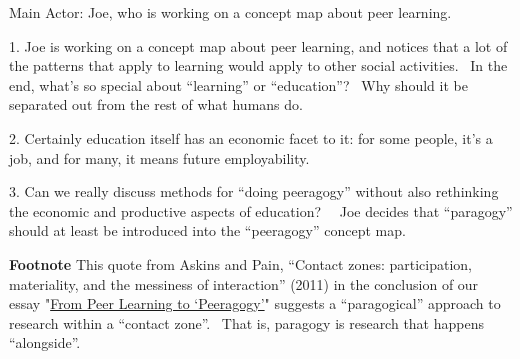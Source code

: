 Main Actor: Joe, who is working on a concept map about peer learning.

1. Joe is working on a concept map about peer learning, and notices that
a lot of the patterns that apply to learning would apply to other social
activities.~ In the end, what's so special about ``learning'' or
``education''?~ Why should it be separated out from the rest of what
humans do.

2. Certainly education itself has an economic facet to it: for some
people, it's a job, and for many, it means future employability.

3. Can we really discuss methods for ``doing peeragogy'' without also
rethinking the economic and productive aspects of education?~~ Joe
decides that ``paragogy'' should at least be introduced into the
``peeragogy'' concept map.

\textbf{Footnote} This quote from Askins and Pain, ``Contact zones:
participation, materiality, and the messiness of interaction'' (2011) in
the conclusion of our essay
"\href{http://peeragogy.org/to-peeragogy/}{From Peer Learning to
`Peeragogy'}" suggests a ``paragogical'' approach to research within a
``contact zone''.~ That is, paragogy is research that happens
``alongside''.
